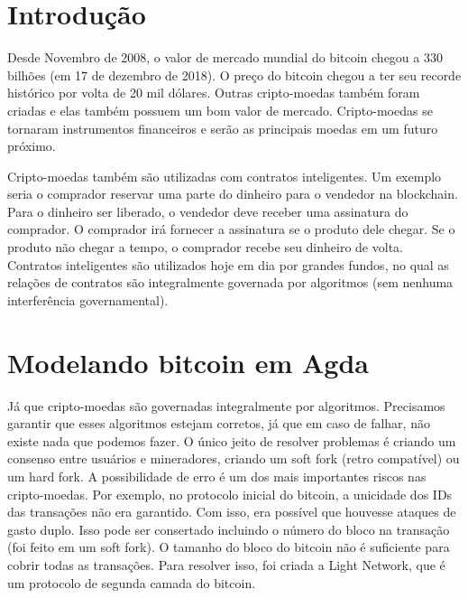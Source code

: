\documentclass[12pt]{report}
\begin{document}

\tableofcontents
\pagebreak

\renewcommand{\thesection}{\arabic{section}}
\section{Introdução}

Desde Novembro de 2008, o valor de mercado mundial do bitcoin chegou a 330 bilhões (em 17 de dezembro de 2018). O preço do bitcoin chegou a ter seu recorde histórico por volta de 20 mil dólares. Outras cripto-moedas também foram criadas e elas também possuem um bom valor de mercado. Cripto-moedas se tornaram instrumentos financeiros e serão as principais moedas em um futuro próximo.

Cripto-moedas também são utilizadas com contratos inteligentes. Um exemplo seria o comprador reservar uma parte do dinheiro para o vendedor na blockchain. Para o dinheiro ser liberado, o vendedor deve receber uma assinatura do comprador. O comprador irá fornecer a assinatura se o produto dele chegar. Se o produto não chegar a tempo, o comprador recebe seu dinheiro de volta. Contratos inteligentes são utilizados hoje em dia por grandes fundos, no qual as relações de contratos são integralmente governada por algoritmos (sem nenhuma interferência governamental).

\section{Modelando bitcoin em Agda}

Já que cripto-moedas são governadas integralmente por algoritmos. Precisamos garantir que esses algoritmos estejam corretos, já que em caso de falhar, não existe nada que podemos fazer. O único jeito de resolver problemas é criando um consenso entre usuários e mineradores, criando um soft fork (retro compatível) ou um hard fork. A possibilidade de erro é um dos mais importantes riscos nas cripto-moedas. Por exemplo, no protocolo inicial do bitcoin, a unicidade dos IDs das transações não era garantido. Com isso, era possível que houvesse ataques de gasto duplo. Isso pode ser consertado incluindo o número do bloco na transação (foi feito em um soft fork). O tamanho do bloco do bitcoin não é suficiente para cobrir todas as transações. Para resolver isso, foi criada a Light Network, que é um protocolo de segunda camada do bitcoin.
\end{document}
